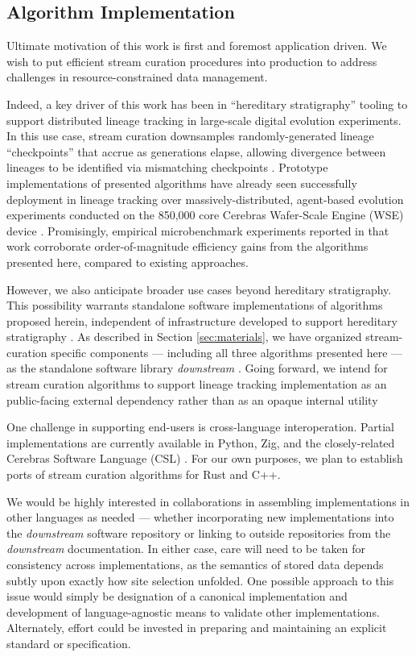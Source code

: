 \subsection{Algorithm Implementation}

Ultimate motivation of this work is first and foremost application driven.
We wish to put efficient stream curation procedures into production to address challenges in resource-constrained data management.

Indeed, a key driver of this work has been in ``hereditary stratigraphy'' tooling to support distributed lineage tracking in large-scale digital evolution experiments.
In this use case, stream curation downsamples randomly-generated lineage ``checkpoints'' that accrue as generations elapse, allowing divergence between lineages to be identified via mismatching checkpoints \citep{moreno2022hereditary}.
Prototype implementations of presented algorithms have already seen successfully deployment in lineage tracking over massively-distributed, agent-based evolution experiments conducted on the 850,000 core Cerebras Wafer-Scale Engine (WSE) device \citep{moreno2024trackable}.
Promisingly, empirical microbenchmark experiments reported in that work corroborate order-of-magnitude efficiency gains from the algorithms presented here, compared to existing approaches.

However, we also anticipate broader use cases beyond hereditary stratigraphy.
This possibility warrants standalone software implementations of algorithms proposed herein, independent of infrastructure developed to support hereditary stratigraphy \citep{moreno2022hstrat}.
As described in Section \ref{sec:materials}, we have organized stream-curation specific components --- including all three algorithms presented here --- as the standalone software library \textit{downstream} \citep{moreno2024downstream}.
Going forward, we intend for stream curation algorithms to support lineage tracking implementation as an public-facing external dependency rather than as an opaque internal utility \citep{moreno2022hstrat}

One challenge in supporting end-users is cross-language interoperation.
Partial implementations are currently available in Python, Zig, and the closely-related Cerebras Software Language (CSL) \citep{moreno2024hsurf,moreno2024downstream,moreno2024wse}.
For our own purposes, we plan to establish ports of stream curation algorithms for Rust and C++.

We would be highly interested in collaborations in assembling implementations in other languages as needed --- whether incorporating new implementations into the \textit{downstream} software repository or linking to outside repositories from the \textit{downstream} documentation.
In either case, care will need to be taken for consistency across implementations, as the semantics of stored data depends subtly upon exactly how site selection unfolded.
One possible approach to this issue would simply be designation of a canonical implementation and development of language-agnostic means to validate other implementations.
Alternately, effort could be invested in preparing and maintaining an explicit standard or specification.
